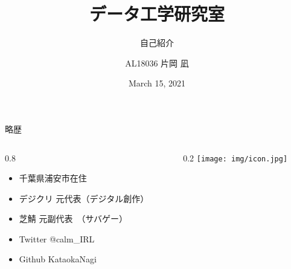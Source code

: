 \documentclass[aspectratio=169, dvipdfmx, 14pt, xcolor={svgnames,dvipsnames}]{beamer}
\title[データ工学研究室 自己紹介]{データ工学研究室}
\subtitle{自己紹介}
\author[片岡 凪]{AL18036 片岡 凪}
\institute[AL18036]{芝浦工業大学 データ工学研究室 B3}
\date{March 15, 2021}
\newlength{\mytotalwidth}
\newlength{\mycolumnwidth}
\begin{document}
\maketitle

\begin{frame}{\quad 略歴}
  \begin{columns}[totalwidth=\mytotalwidth]
    \begin{column}[t]{0.8\mycolumnwidth}
      \begin{itemize}
        \item 千葉県浦安市在住
        \item デジクリ 元代表（デジタル創作）
        \item 芝鯖 元副代表　（サバゲー）
        \item Twitter @calm\_IRL
        \item Github  KataokaNagi
      \end{itemize}
    \end{column}
    \begin{column}[T]{0.2\mycolumnwidth}
      \centering
      \texttt{[image: img/icon.jpg]}
    \end{column}
  \end{columns}
\end{frame}
\end{document}
